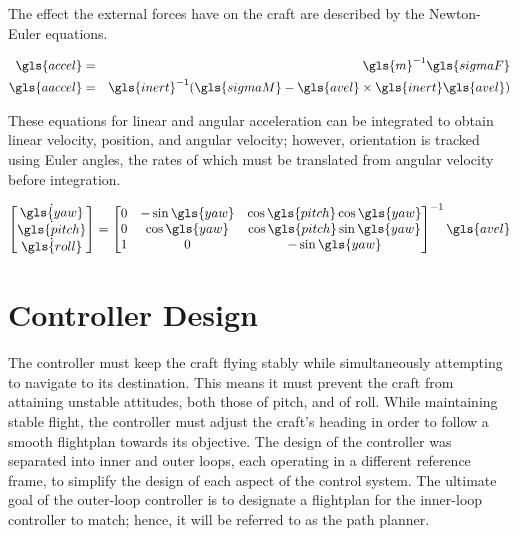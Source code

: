 \documentclass{sydeStyle}
\begin{document}
The effect the external forces have on the craft are described by the
Newton-Euler equations.

\begin{eqnarray*}
\gls{accel}  &=& \gls{m}^{-1} \gls{sigmaF} \\
\gls{aaccel} &=& \gls{inert}^{-1}(\gls{sigmaM} - \gls{avel} \times \gls{inert} \gls{avel}) \\
\end{eqnarray*}

These equations for linear and angular acceleration can be integrated to obtain
linear velocity, position, and angular velocity; however, orientation is tracked
using Euler angles, the rates of which must be translated from angular velocity
before integration.

\begin{displaymath}
\left[ \begin{matrix}
\dot{\gls{yaw}} \\
\dot{\gls{pitch}} \\
\dot{\gls{roll}}
\end{matrix} \right] = \left[ \begin{matrix}
0 & -\sin \gls{yaw} &  \cos \gls{pitch} \cos \gls{yaw} \\
0 &  \cos \gls{yaw} &  \cos \gls{pitch} \sin \gls{yaw} \\
1 &  0              & -\sin \gls{yaw}
\end{matrix} \right] ^{-1} \gls{avel}
\end{displaymath}

\section{Controller Design}
\label{sec:ctrldes}

The controller must keep the craft flying stably while simultaneously attempting
to navigate to its destination.  This means it must prevent the craft from
attaining unstable attitudes, both those of pitch, and of roll.  While
maintaining stable flight, the controller must adjust the craft's heading in
order to follow a smooth flightplan towards its objective.  The design of the
controller was separated into inner and outer loops, each operating in a
different reference frame, to simplify the design of each aspect of the control
system.  The ultimate goal of the outer-loop controller is to designate a
flightplan for the inner-loop controller to match; hence, it will be referred to
as the path planner.
\end{document}
